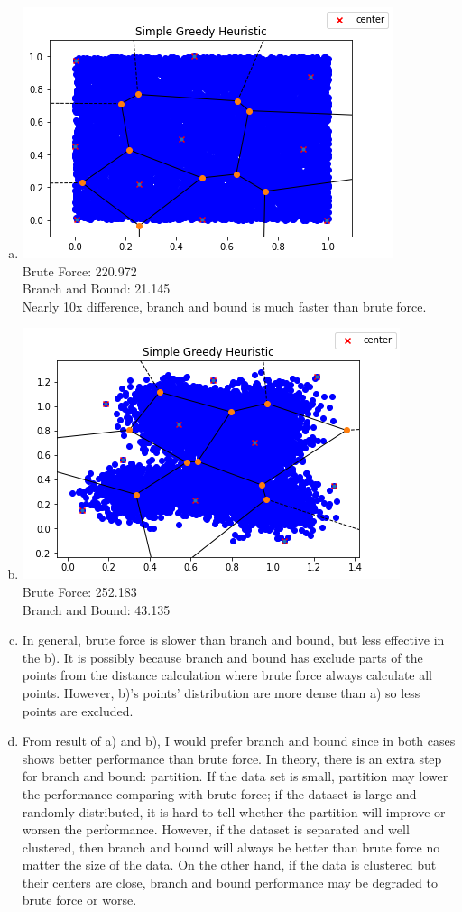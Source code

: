 \documentclass{article}
\begin{document}
\begin{enumerate}[a)]
    \item \includegraphics[]{3/1} \\ Brute Force: 220.972\\
    Branch and Bound: 21.145 \\
    Nearly 10x difference, branch and bound is much faster than brute force.
    \item \includegraphics[]{3/2} \\ Brute Force: 252.183 \\
    Branch and Bound: 43.135
    \item In general, brute force is slower than branch and bound, but less effective in the b). It is possibly because branch and bound has exclude parts of the points from the distance calculation where brute force always calculate all points. However, b)'s points' distribution are more dense than a) so less points are excluded. 
    \item From result of a) and b), I would prefer branch and bound since in both cases  shows better performance than brute force. In theory, there is an extra step for branch and bound: partition. If the data set is small, partition may lower the performance comparing with brute force; if the dataset is large and randomly distributed, it is hard to tell whether the partition will improve or worsen the performance. However, if the dataset is separated and well clustered, then branch and bound will always be better than brute force no matter the size of the data. On the other hand, if the data is clustered but their centers are close, branch and bound performance may be degraded to brute force or worse.
\end{enumerate}
\end{document}
